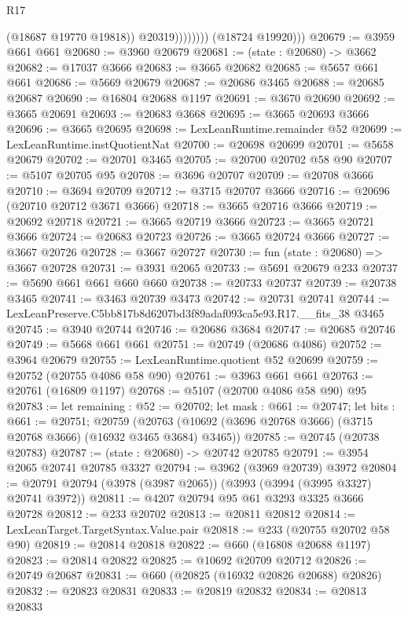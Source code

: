 \begin{lexlean}{R17}
\begin{coremodule}
                          (@18687 @19770 @19818))
                        @20319))))))))
        (@18724 @19920)))
@20679 := @3959 @661 @661
@20680 := @3960 @20679
@20681 := (state : @20680) -> @3662
@20682 := @17037 @3666
@20683 := @3665 @20682
@20685 := @5657 @661 @661
@20686 := @5669 @20679
@20687 := @20686 @3465
@20688 := @20685 @20687
@20690 := @16804 @20688 @1197
@20691 := @3670 @20690
@20692 := @3665 @20691
@20693 := @20683 @3668
@20695 := @3665 @20693 @3666
@20696 := @3665 @20695
@20698 := LexLeanRuntime.remainder @52
@20699 := LexLeanRuntime.instQuotientNat
@20700 := @20698 @20699
@20701 := @5658 @20679
@20702 := @20701 @3465
@20705 := @20700 @20702 @58 @90
@20707 := @5107 @20705 @95
@20708 := @3696 @20707
@20709 := @20708 @3666
@20710 := @3694 @20709
@20712 := @3715 @20707 @3666
@20716 := @20696 (@20710 @20712 @3671 @3666)
@20718 := @3665 @20716 @3666
@20719 := @20692 @20718
@20721 := @3665 @20719 @3666
@20723 := @3665 @20721 @3666
@20724 := @20683 @20723
@20726 := @3665 @20724 @3666
@20727 := @3667 @20726
@20728 := @3667 @20727
@20730 := fun (state : @20680) => @3667 @20728
@20731 := @3931 @2065
@20733 := @5691 @20679 @233
@20737 := @5690 @661 @661 @660 @660
@20738 := @20733 @20737
@20739 := @20738 @3465
@20741 := @3463 @20739 @3473
@20742 := @20731 @20741
@20744 := LexLeanPreserve.C5bb817b8d6207bd3f89adaf093ca5e93.R17.__fits_38 @3465
@20745 := @3940 @20744
@20746 := @20686 @3684
@20747 := @20685 @20746
@20749 := @5668 @661 @661
@20751 := @20749 (@20686 @4086)
@20752 := @3964 @20679
@20755 := LexLeanRuntime.quotient @52 @20699
@20759 := @20752 (@20755 @4086 @58 @90)
@20761 := @3963 @661 @661
@20763 := @20761 (@16809 @1197)
@20768 := @5107 (@20700 @4086 @58 @90) @95
@20783 := let remaining : @52 := @20702;
  let mask : @661 := @20747;
  let bits : @661 := @20751;
  @20759 (@20763 (@10692 (@3696 @20768 @3666) (@3715 @20768 @3666) (@16932 @3465 @3684) @3465))
@20785 := @20745 (@20738 @20783)
@20787 := (state : @20680) -> @20742 @20785
@20791 := @3954 @2065 @20741 @20785 @3327
@20794 := @3962 (@3969 @20739) @3972
@20804 := @20791 @20794 (@3978 (@3987 @2065)) (@3993 (@3994 (@3995 @3327) @20741 @3972))
@20811 := @4207 @20794 @95 @61 @3293 @3325 @3666 @20728
@20812 := @233 @20702
@20813 := @20811 @20812
@20814 := LexLeanTarget.TargetSyntax.Value.pair
@20818 := @233 (@20755 @20702 @58 @90)
@20819 := @20814 @20818
@20822 := @660 (@16808 @20688 @1197)
@20823 := @20814 @20822
@20825 := @10692 @20709 @20712
@20826 := @20749 @20687
@20831 := @660 (@20825 (@16932 @20826 @20688) @20826)
@20832 := @20823 @20831
@20833 := @20819 @20832
@20834 := @20813 @20833

\end{coremodule}
\end{lexlean}
